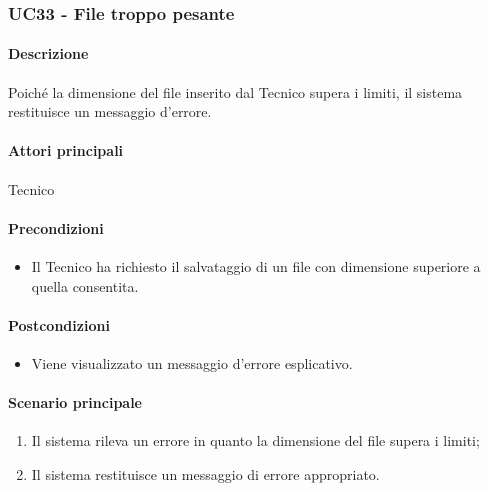 \subsubsection{UC33 - File troppo pesante}\label{UC33}
\paragraph*{Descrizione}
Poiché la dimensione del file inserito dal Tecnico supera i limiti, il sistema restituisce un messaggio d'errore.

\paragraph*{Attori principali}
Tecnico

\paragraph*{Precondizioni}
\begin{itemize}
  \item Il Tecnico ha richiesto il salvataggio di un file con dimensione superiore a quella consentita.
\end{itemize}

\paragraph*{Postcondizioni}
\begin{itemize}
  \item Viene visualizzato un messaggio d'errore esplicativo.
\end{itemize}

\paragraph*{Scenario principale}
\begin{enumerate}
  \item Il sistema rileva un errore in quanto la dimensione del file supera i limiti;
  \item Il sistema restituisce un messaggio di errore appropriato.
\end{enumerate}
